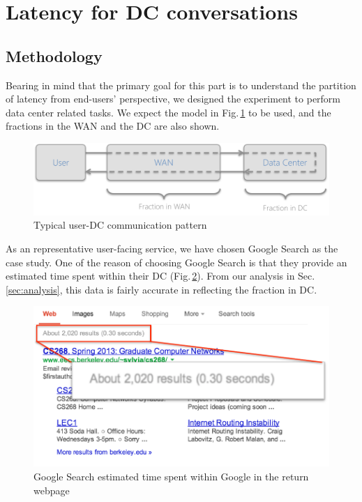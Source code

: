 \section{Latency for DC conversations}

\subsection{Methodology}

Bearing in mind that the primary goal for this part is to understand the partition of latency from end-users' perspective, we designed the experiment to perform data center related tasks. We expect the model in Fig.\,\ref{fig:DC_model} to be used, and the fractions in the WAN and the DC are also shown. 

\begin{figure}
  \centering
  \includegraphics[width=\linewidth]{../figs/DC_model.pdf}
  \caption{Typical user-DC communication pattern}
  \label{fig:DC_model}
\end{figure}

As an representative user-facing service, we have chosen Google Search as the case study. One of the reason of choosing Google Search is that they provide an estimated time spent within their DC (Fig.\,\ref{fig:google_time}). From our analysis in Sec.\,\ref{sec:analysis}, this data is fairly accurate in reflecting the fraction in DC. 

\begin{figure}
  \centering
  \includegraphics[width=0.85\linewidth]{../figs/GoogleTime.pdf}
  \caption{Google Search estimated time spent within Google in the return webpage}
  \label{fig:google_time}
\end{figure}

